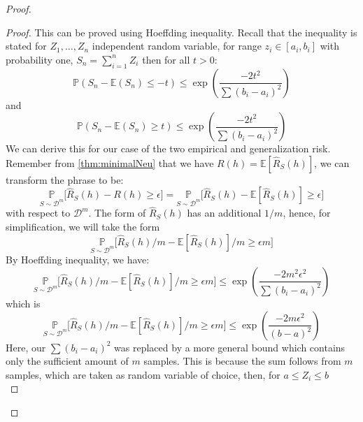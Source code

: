 \documentclass[
  journal=largetwo,
  year=2025,
  volume=37,
]{cup-journal}
\begin{document}
\begin{proof}
\begin{proof}
    This can be proved using Hoeffding inequality. Recall that the inequality is stated for $Z_{1},\dots,Z_{n}$ independent random variable, for range $z_{i}\in [a_{i},b_{i}]$ with probability one, $S_{n}=\sum_{i=1}^{n}Z_{i}$ then for all $t>0$:
    \begin{equation*}
        \mathbb{P}(S_{n} - \mathbb{E}(S_n)\leq -t) \leq \exp{\left(\frac{-2t^2}{\sum (b_{i} - a_{i})^{2}}\right)}
    \end{equation*}
    and 
    \begin{equation*}
        \mathbb{P}(S_{n} - \mathbb{E}(S_n)\geq t) \leq \exp{\left(\frac{-2t^2}{\sum (b_{i} - a_{i})^{2}}\right)}
    \end{equation*}
    We can derive this for our case of the two empirical and generalization risk. Remember from \ref{thm:minimalNeu} that we have $R(h)=\mathbb{E}[\hat{R}_{S}(h)]$, we can transform the phrase to be: \begin{equation*}
        \underset{S\sim \mathcal{D}^{m}}{\mathbb{P}} \Big[ \hat{R}_{S}(h) - R(h) \geq \epsilon \Big] = \underset{S\sim \mathcal{D}^{m}}{\mathbb{P}} \Big[ \hat{R}_{S}(h) - \mathbb{E}[\hat{R}_{S}(h)] \geq \epsilon \Big]
    \end{equation*}
    with respect to $\mathcal{D}^{m}$. The form of $\hat{R}_{S}(h)$ has an additional $1/m$, hence, for simplification, we will take the form \begin{equation*}
        \underset{S\sim \mathcal{D}^{m}}{\mathbb{P}} \Big[ \hat{R}_{S}(h)/m - \mathbb{E}[\hat{R}_{S}(h)]/m \geq \epsilon m \Big]
    \end{equation*}
    By Hoeffding inequality, we have: 
    \begin{equation}
        \underset{S\sim \mathcal{D}^{m}}{\mathbb{P}} \Big[ \hat{R}_{S}(h)/m - \mathbb{E}[\hat{R}_{S}(h)]/m \geq \epsilon m \Big] \leq \exp{\left(\frac{-2m^{2}\epsilon^{2}}{\sum (b_{i} - a_{i})^{2}}\right)} 
    \end{equation}
    which is 
    \begin{equation*}
        \underset{S\sim \mathcal{D}^{m}}{\mathbb{P}} \Big[ \hat{R}_{S}(h)/m - \mathbb{E}[\hat{R}_{S}(h)]/m \geq \epsilon m \Big] \leq \exp{\left(\frac{-2m\epsilon^{2}}{(b-a)^{2}}\right)}
    \end{equation*}
    Here, our $\sum (b_{i} - a_{i})^{2}$ was replaced by a more general bound which contains only the sufficient amount of $m$ samples. This is because the sum follows from $m$ samples, which are taken as random variable of choice, then, for $a\leq Z_i \leq b$ \begin{equation*}

\end{equation*}
\end{proof}
\end{proof}
\end{document}
